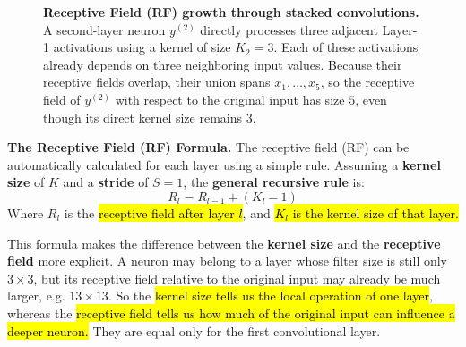 \begin{figure}[htbp]
    \caption{\textbf{Receptive Field (RF) growth through stacked convolutions.} A second-layer neuron $y^{(2)}$ directly processes three adjacent Layer-1 activations using a kernel of size $K_2=3$. Each of these activations already depends on three neighboring input values. Because their receptive fields overlap, their union spans $x_1,\ldots,x_5$, so the receptive field of $y^{(2)}$ with respect to the original input has size $5$, even though its direct kernel size remains $3$.}
    \label{fig:receptive-field-growth}
\end{figure}

\noindent
\textcolor{Green3}{ \textbf{The Receptive Field (RF) Formula.}} The receptive field (RF) can be automatically calculated for each layer using a simple rule. Assuming a \textbf{kernel size} of $K$ and a \textbf{stride} of $S = 1$, the \textbf{general recursive rule} is:
\begin{equation}\label{eq:receptive-field-formula-no-pooling-stride-1}
    R_{l} = R_{l-1} + \left(K_{l} - 1\right)
\end{equation}
Where $R_{l}$ is the \hl{receptive field after layer $l$}, and \hl{$K_{l}$ is the kernel size of that layer.}

\highspace
This formula makes the difference between the \textbf{kernel size} and the \textbf{receptive field} more explicit. A neuron may belong to a layer whose filter size is still only $3\times3$, but its receptive field relative to the original input may already be much larger, e.g. $13 \times 13$. So the \hl{kernel size tells us the local operation of one layer}, whereas the \hl{receptive field tells us how much of the original input can influence a deeper neuron.} They are equal only for the first convolutional layer.

